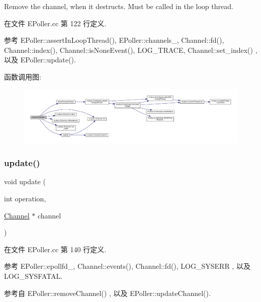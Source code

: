 Remove the channel, when it destructs. Must be called in the loop thread. 

在文件 E\+Poller.\+cc 第 122 行定义.



参考 E\+Poller\+::assert\+In\+Loop\+Thread(), E\+Poller\+::channels\+\_\+, Channel\+::fd(), Channel\+::index(), Channel\+::is\+None\+Event(), L\+O\+G\+\_\+\+T\+R\+A\+CE, Channel\+::set\+\_\+index() , 以及 E\+Poller\+::update().

函数调用图\+:
\nopagebreak
\begin{figure}[H]
\begin{center}
\leavevmode
\includegraphics[width=350pt]{classmuduo_1_1EPoller_ab10f76c92cb5269f8296e5b3e4dd0ef9_cgraph}
\end{center}
\end{figure}
\mbox{\label{classmuduo_1_1EPoller_af32077955d1a8c910bde719cb636efd8}} 
\subsubsection{\texorpdfstring{update()}{update()}}
{\footnotesize\ttfamily void update (\begin{DoxyParamCaption}\item[{int}]{operation,  }\item[{\hyperlink{classmuduo_1_1Channel}{Channel} $\ast$}]{channel }\end{DoxyParamCaption})\hspace{0.3cm}{\ttfamily [private]}}



在文件 E\+Poller.\+cc 第 140 行定义.



参考 E\+Poller\+::epollfd\+\_\+, Channel\+::events(), Channel\+::fd(), L\+O\+G\+\_\+\+S\+Y\+S\+E\+RR , 以及 L\+O\+G\+\_\+\+S\+Y\+S\+F\+A\+T\+AL.



参考自 E\+Poller\+::remove\+Channel() , 以及 E\+Poller\+::update\+Channel().

